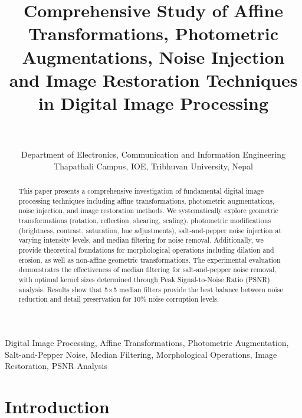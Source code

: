 \documentclass[a4paper, journal]{IEEEtran}
\begin{document}
\title{Comprehensive Study of Affine Transformations, Photometric Augmentations, Noise Injection and Image Restoration Techniques in Digital Image Processing}
\author{
     \\
     \quad \\
    Department of Electronics, Communication and Information Engineering\\
    Thapathali Campus, IOE, Tribhuvan University, Nepal\\
}

\maketitle

\begin{abstract}
    This paper presents a comprehensive investigation of fundamental digital image processing techniques including affine transformations, photometric augmentations, noise injection, and image restoration methods. We systematically explore geometric transformations (rotation, reflection, shearing, scaling), photometric modifications (brightness, contrast, saturation, hue adjustments), salt-and-pepper noise injection at varying intensity levels, and median filtering for noise removal. Additionally, we provide theoretical foundations for morphological operations including dilation and erosion, as well as non-affine geometric transformations. The experimental evaluation demonstrates the effectiveness of median filtering for salt-and-pepper noise removal, with optimal kernel sizes determined through Peak Signal-to-Noise Ratio (PSNR) analysis. Results show that 5×5 median filters provide the best balance between noise reduction and detail preservation for 10\% noise corruption levels.
\end{abstract}

\begin{IEEEkeywords}
    Digital Image Processing, Affine Transformations, Photometric Augmentation, Salt-and-Pepper Noise, Median Filtering, Morphological Operations, Image Restoration, PSNR Analysis
\end{IEEEkeywords}

\section{Introduction}
\end{document}
